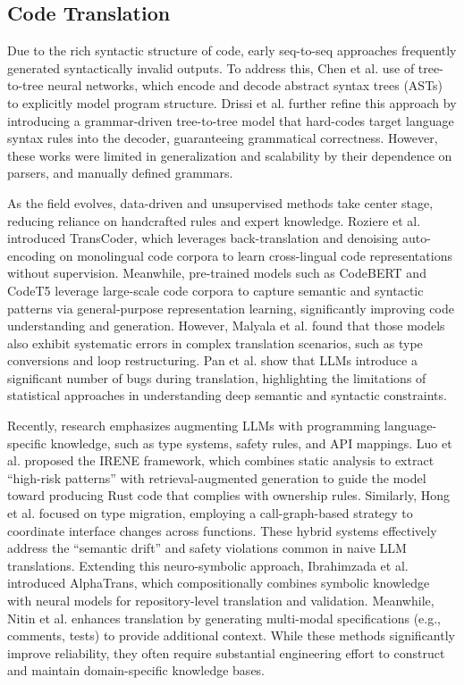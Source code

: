 \subsection{Code Translation}

Due to the rich syntactic structure of code, early seq-to-seq approaches frequently generated syntactically invalid outputs. To address this, Chen et al. \cite{chen2018tree} use of tree-to-tree neural networks, which encode and decode abstract syntax trees (ASTs) to explicitly model program structure. Drissi et al. \cite{drissi2018program} further refine this approach by introducing a grammar-driven tree-to-tree model that hard-codes target language syntax rules into the decoder, guaranteeing grammatical correctness. However, these works were limited in generalization and scalability by their dependence on parsers, and manually defined grammars.
 
As the field evolves, data-driven and unsupervised methods take center stage, reducing reliance on handcrafted rules and expert knowledge. Roziere et al.\cite{roziere2020unsupervised} introduced TransCoder, which leverages back-translation and denoising auto-encoding on monolingual code corpora to learn cross-lingual code representations without supervision. Meanwhile, pre-trained models such as CodeBERT and CodeT5 leverage large-scale code corpora to capture semantic and syntactic patterns via general-purpose representation learning, significantly improving code understanding and generation. However, Malyala et al.\cite{malyala2023ml} found that those models also exhibit systematic errors in complex translation scenarios, such as type conversions and loop restructuring. Pan et al.\cite{pan2024lost} show that LLMs introduce a significant number of bugs during translation, highlighting the limitations of statistical approaches in understanding deep semantic and syntactic constraints.

Recently, research emphasizes augmenting LLMs with programming language-specific knowledge, such as type systems, safety rules, and API mappings. Luo et al. \cite{luo2025integrating} proposed the IRENE framework, which combines static analysis to extract ``high-risk patterns'' with retrieval-augmented generation to guide the model toward producing Rust code that complies with ownership rules. Similarly, Hong et al. \cite{hong2025type} focused on type migration, employing a call-graph-based strategy to coordinate interface changes across functions. These hybrid systems effectively address the ``semantic drift'' and safety violations common in naive LLM translations. Extending this neuro-symbolic approach, Ibrahimzada et al. \cite{ibrahimzada2025alphatrans} introduced AlphaTrans, which compositionally combines symbolic knowledge with neural models for repository-level translation and validation. Meanwhile, Nitin et al.\cite{nitin2024spectra} enhances translation by generating multi-modal specifications (e.g., comments, tests) to provide additional context. While these methods significantly improve reliability, they often require substantial engineering effort to construct and maintain domain-specific knowledge bases.



